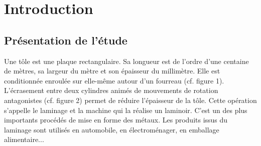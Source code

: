 \documentclass[11pt,oneside]{article}
\begin{document}
\vspace{.5cm}

\section{Introduction}
\subsection{Présentation de l'étude}

Une tôle est une plaque rectangulaire. Sa longueur est de l'ordre d'une centaine de mètres, sa largeur du mètre et son épaisseur du millimètre. Elle est conditionnée enroulée sur elle-même autour d'un fourreau (cf. figure 1). L'écrasement entre deux cylindres animés de mouvements de rotation antagonistes (cf. figure 2) permet de réduire l'épaisseur de la tôle. Cette opération s'appelle le laminage et la machine qui la réalise un laminoir. C'est un des plus importants procédés de mise en forme des métaux. Les produits issus du laminage sont utilisés en automobile, en électroménager, en emballage alimentaire...

\vspace{.25cm}
\end{document}
